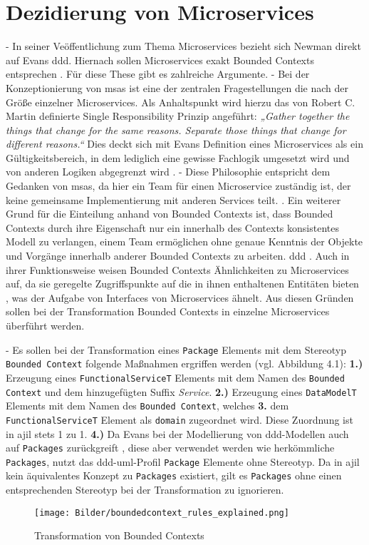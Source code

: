 \documentclass[
	oneside,  %
	ngerman, 
	final, 
	11pt, 
	a4paper, 
	1.1headlines, 
	headinclude=false, 
	footinclude=false, 
	mpinclude=false, 
	pagesize, 
	onecolumn, 
	titlepage, 
	parskip=half, 
	headsepline, 
	chapterprefix=false, 
	version=first, 
	listof=totoc, 
	bibliography=totoc, 
	toc=graduated, 
	fleqn
]{scrbook}
\begin{document}
\section{Dezidierung von Microservices}
- In seiner Veöffentlichung zum Thema Microservices bezieht sich Newman direkt auf Evans \ac{ddd}. Hiernach sollen Microservices exakt Bounded Contexts entsprechen \cite{BuildingMicroServices}. Für diese These gibt es zahlreiche Argumente.
- Bei der Konzeptionierung von \ac{msa}s ist eine der zentralen Fragestellungen die nach der Größe einzelner Microservices. Als Anhaltspunkt wird hierzu das von Robert C. Martin definierte Single Responsibility Prinzip angeführt: \cite{BuildingMicroServices} \textit{„Gather together the things that change for the same reasons. Separate those things that change for different reasons.“} \cite{Martin2003} Dies deckt sich mit Evans Definition eines Microservices als ein  Gültigkeitsbereich, in dem lediglich eine gewisse Fachlogik umgesetzt wird und von anderen Logiken abgegrenzt wird \cite{DDDEvans}. 
- Diese Philosophie entspricht
dem Gedanken von \ac{msa}s, da hier ein Team für einen Microservice zuständig ist, der
keine gemeinsame Implementierung mit anderen Services teilt. \cite{MicroServicesVSSOA}. Ein weiterer Grund für die Einteilung anhand von Bounded Contexts ist, dass Bounded
Contexts durch ihre Eigenschaft nur ein innerhalb des Contexts konsistentes Modell zu
verlangen, einem Team ermöglichen ohne genaue Kenntnis der Objekte und Vorgänge
innerhalb anderer Bounded Contexts zu arbeiten. \ac{ddd} \cite{DDDEvans}.
 Auch in ihrer Funktionsweise weisen Bounded Contexts Ähnlichkeiten zu Microservices auf, da sie geregelte Zugriffspunkte auf die in ihnen enthaltenen Entitäten bieten \cite{DDDEvans}, was der Aufgabe von Interfaces von Microservices ähnelt.
 Aus diesen Gründen sollen bei der Transformation Bounded Contexts in einzelne Microservices überführt werden.

- Es sollen bei der Transformation eines \texttt{Package} Elements mit dem Stereotyp \texttt{Bounded Context} folgende Maßnahmen ergriffen werden (vgl. Abbildung 4.1): \textbf{1.)} Erzeugung eines \texttt{FunctionalServiceT} Elements mit dem Namen des \texttt{Bounded Context} und dem hinzugefügten Suffix \textit{Service}. \textbf{2.)} Erzeugung eines \texttt{DataModelT} Elements mit dem Namen des \texttt{Bounded Context}, welches \textbf{3.} dem \texttt{FunctionalServiceT} Element als \texttt{domain} zugeordnet wird. Diese Zuordnung ist in \ac{ajil} stets 1 zu 1. \textbf{4.)} Da Evans bei der Modellierung von \ac{ddd}-Modellen auch auf \texttt{Packages} zurückgreift \cite{DDDEvans}, diese aber verwendet werden wie herkömmliche  \texttt{Packages}, nutzt das \ac{ddd}-\ac{uml}-Profil \texttt{Package} Elemente ohne Stereotyp. Da in \ac{ajil} kein äquivalentes Konzept zu \texttt{Packages} existiert, gilt es \texttt{Packages} ohne einen entsprechenden Stereotyp bei der Transformation zu ignorieren.
\begin{figure}
\texttt{[image: Bilder/boundedcontext\_rules\_explained.png]}
\caption{Transformation von Bounded Contexts}
\end{figure}
\end{document}
